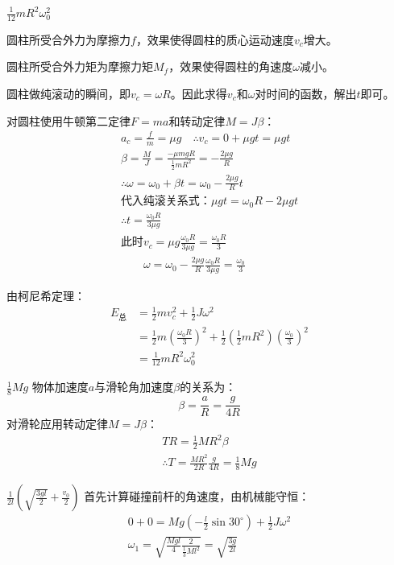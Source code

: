 \documentclass[b5paper,opensource]{qyxf-book}
\begin{document}
$\frac{1}{12}mR^2\omega_0^2$

圆柱所受合外力为摩擦力$f$，效果使得圆柱的质心运动速度$ v_c $增大。

圆柱所受合外力矩为摩擦力矩$ M_f $，效果使得圆柱的角速度$ \omega $减小。

圆柱做纯滚动的瞬间，即$ v_c=\omega R $。因此求得$ v_c $和$ \omega $对时间的函数，解出$ t $即可。

对圆柱使用牛顿第二定律$F=ma$和转动定律$M=J\beta$：
\begin{gather*}
a_c=\frac{f}{m}=\mu g\quad\therefore v_c=0+\mu gt=\mu gt\\
\beta=\frac{M}{J}=\frac{-\mu mgR}{\frac{1}{2}mR^2}=-\frac{2\mu g}{R}\\
\therefore \omega=\omega_0+\beta t=\omega_0-\frac{2\mu g}{R}t\\
\text{代入纯滚关系式：}\mu gt=\omega_0R-2\mu gt\\
\therefore t=\frac{\omega_0R}{3\mu g}\\
\text{此时}v_c=\mu g\frac{\omega_0R}{3\mu g}=\frac{\omega_0R}{3}\\
\hspace{2em}\omega=\omega_0-\frac{2\mu g}{R}\frac{\omega_0R}{3\mu g}=\frac{\omega_0}{3}
\end{gather*}

由柯尼希定理：
\begin{align*}
E_{\text{总}}&=\frac{1}{2}mv_c^2+\frac{1}{2}J\omega^2\\
&=\frac{1}{2}m\left(\frac{\omega_0R}{3}\right)^2+\frac{1}{2}\left(\frac{1}{2}mR^2\right)\left(\frac{\omega_0}{3}\right)^2\\
&=\frac{1}{12}mR^2\omega_0^2
\end{align*}

$\frac{1}{8}Mg$
物体加速度$ a $与滑轮角加速度$ \beta $的关系为：
\[\beta=\frac{a}{R}=\frac{g}{4R}\]
对滑轮应用转动定律$M=J\beta$：
\begin{gather*}
TR=\frac{1}{2}MR^2\beta\\
\therefore T=\frac{MR^2}{2R}\frac{g}{4R}=\frac{1}{8}Mg
\end{gather*}

$\frac{1}{2l}\left(\sqrt{\frac{3gl}{2}}+\frac{v_0}{2}\right)$
首先计算碰撞前杆的角速度，由机械能守恒：
\begin{gather*}
0+0=Mg(-\frac{l}{2}\sin 30^\circ)+\frac{1}{2}J\omega^2\\
\omega_1=\sqrt{\frac{Mgl}{4}\frac{2}{\frac{1}{3}Ml^2}}=\sqrt{\frac{3g}{2l}}
\end{gather*}
\end{document}
